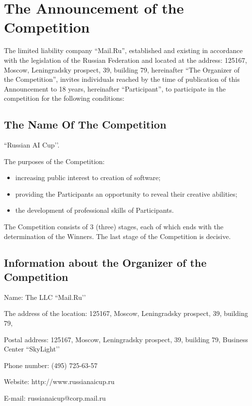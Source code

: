 \setlength{\parskip}{0.125in}

\chapter{The Announcement of the Competition}

The limited liability company ``Mail.Ru'', established and existing in accordance with the legislation of the Russian Federation 
and located at the address: 125167, Moscow, Leningradsky prospect, 39, building 79, hereinafter ``The Organizer of the Competition'',
invites individuals reached by the time of publication of this Announcement to 18 years, hereinafter ``Participant'',
to participate in the competition for the following conditions:

\section{The Name Of The Competition}

``Russian AI Cup’’.

The purposes of the Competition:
\begin{itemize}
\item increasing public interest to creation of software;
\item providing the Participants an opportunity to reveal their creative abilities;
\item the development of professional skills of Participants.
\end{itemize}

The Competition consists of 3 (three) stages, each of which ends with the determination of the Winners. The last stage of the Competition is decisive.

\section{Information about the Organizer of the Competition}

Name: The LLC ``Mail.Ru’’

The address of the location: 125167, Moscow, Leningradsky prospect, 39, building 79,

Postal address: 125167, Moscow, Leningradsky prospect, 39, building 79, Business Center ``SkyLight’’

Phone number: (495) 725-63-57

Website: http://www.russianaicup.ru

E-mail: russianaicup@corp.mail.ru

